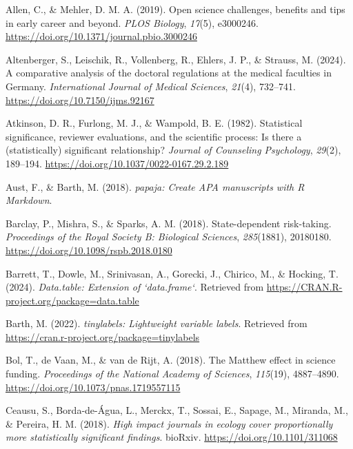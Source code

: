 \documentclass[
  british,
  a4paper,
  ,man,floatsintext]{apa6}
\newlength{\cslhangindent}
\newenvironment{CSLReferences}[2] %
 {\begin{list}{}{%
  \setlength{\itemindent}{0pt}
  \setlength{\leftmargin}{0pt}
  \setlength{\parsep}{0pt}
  \ifodd #1
   \setlength{\leftmargin}{\cslhangindent}
   \setlength{\itemindent}{-1\cslhangindent}
  \fi
  \setlength{\itemsep}{#2\baselineskip}}}
 {\end{list}}
\begin{document}
\label{refs}
\begin{CSLReferences}{1}{0}
Allen, C., \& Mehler, D. M. A. (2019). Open science challenges, benefits and tips in early career and beyond. \emph{PLOS Biology}, \emph{17}(5), e3000246. \url{https://doi.org/10.1371/journal.pbio.3000246}

Altenberger, S., Leischik, R., Vollenberg, R., Ehlers, J. P., \& Strauss, M. (2024). A comparative analysis of the doctoral regulations at the medical faculties in {Germany}. \emph{International Journal of Medical Sciences}, \emph{21}(4), 732--741. \url{https://doi.org/10.7150/ijms.92167}

Atkinson, D. R., Furlong, M. J., \& Wampold, B. E. (1982). Statistical significance, reviewer evaluations, and the scientific process: {Is} there a (statistically) significant relationship? \emph{Journal of Counseling Psychology}, \emph{29}(2), 189--194. \url{https://doi.org/10.1037/0022-0167.29.2.189}

Aust, F., \& Barth, M. (2018). \emph{{papaja}: {Create APA} manuscripts with {R Markdown}}.

Barclay, P., Mishra, S., \& Sparks, A. M. (2018). State-dependent risk-taking. \emph{Proceedings of the Royal Society B: Biological Sciences}, \emph{285}(1881), 20180180. \url{https://doi.org/10.1098/rspb.2018.0180}

Barrett, T., Dowle, M., Srinivasan, A., Gorecki, J., Chirico, M., \& Hocking, T. (2024). \emph{Data.table: Extension of `data.frame`}. Retrieved from \url{https://CRAN.R-project.org/package=data.table}

Barth, M. (2022). \emph{{tinylabels}: Lightweight variable labels}. Retrieved from \url{https://cran.r-project.org/package=tinylabels}

Bol, T., de Vaan, M., \& van de Rijt, A. (2018). The {Matthew} effect in science funding. \emph{Proceedings of the National Academy of Sciences}, \emph{115}(19), 4887--4890. \url{https://doi.org/10.1073/pnas.1719557115}

Ceausu, S., Borda-de-Água, L., Merckx, T., Sossai, E., Sapage, M., Miranda, M., \& Pereira, H. M. (2018). \emph{High impact journals in ecology cover proportionally more statistically significant findings}. bioRxiv. \url{https://doi.org/10.1101/311068}


\end{CSLReferences}
\end{document}
